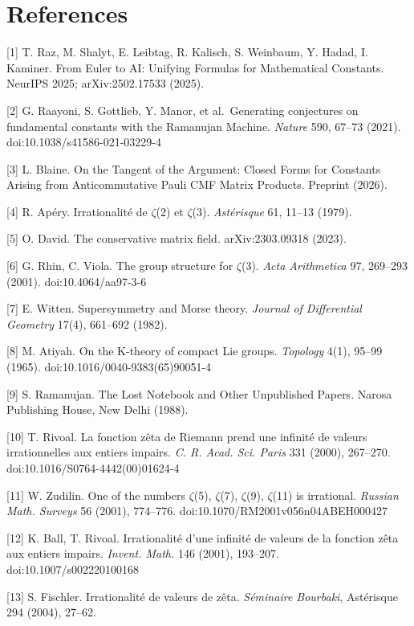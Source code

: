 \documentclass[11pt]{article}
\begin{document}
\hypertarget{references}{%
\section{References}\label{references}}

{[}1{]} T. Raz, M. Shalyt, E. Leibtag, R. Kalisch, S. Weinbaum, Y.
Hadad, I. Kaminer. From Euler to AI: Unifying Formulas for Mathematical
Constants. NeurIPS 2025; arXiv:2502.17533 (2025).

{[}2{]} G. Raayoni, S. Gottlieb, Y. Manor, et al.~Generating conjectures
on fundamental constants with the Ramanujan Machine. \emph{Nature} 590,
67--73 (2021). doi:10.1038/s41586-021-03229-4

{[}3{]} L. Blaine. On the Tangent of the Argument: Closed Forms for
Constants Arising from Anticommutative Pauli CMF Matrix Products.
Preprint (2026).

{[}4{]} R. Apéry. Irrationalité de \(\zeta\)(2) et \(\zeta\)(3).
\emph{Astérisque} 61, 11--13 (1979).

{[}5{]} O. David. The conservative matrix field. arXiv:2303.09318
(2023).

{[}6{]} G. Rhin, C. Viola. The group structure for \(\zeta\)(3).
\emph{Acta Arithmetica} 97, 269--293 (2001). doi:10.4064/aa97-3-6

{[}7{]} E. Witten. Supersymmetry and Morse theory. \emph{Journal of
Differential Geometry} 17(4), 661--692 (1982).

{[}8{]} M. Atiyah. On the K-theory of compact Lie groups.
\emph{Topology} 4(1), 95--99 (1965). doi:10.1016/0040-9383(65)90051-4

{[}9{]} S. Ramanujan. The Lost Notebook and Other Unpublished Papers.
Narosa Publishing House, New Delhi (1988).

{[}10{]} T. Rivoal. La fonction zêta de Riemann prend une infinité de
valeurs irrationnelles aux entiers impairs. \emph{C. R. Acad. Sci.
Paris} 331 (2000), 267--270. doi:10.1016/S0764-4442(00)01624-4

{[}11{]} W. Zudilin. One of the numbers \(\zeta\)(5), \(\zeta\)(7),
\(\zeta\)(9), \(\zeta\)(11) is irrational. \emph{Russian Math. Surveys}
56 (2001), 774--776. doi:10.1070/RM2001v056n04ABEH000427

{[}12{]} K. Ball, T. Rivoal. Irrationalité d'une infinité de valeurs de
la fonction zêta aux entiers impairs. \emph{Invent. Math.} 146 (2001),
193--207. doi:10.1007/s002220100168

{[}13{]} S. Fischler. Irrationalité de valeurs de zêta. \emph{Séminaire
Bourbaki}, Astérisque 294 (2004), 27--62.
\end{document}
